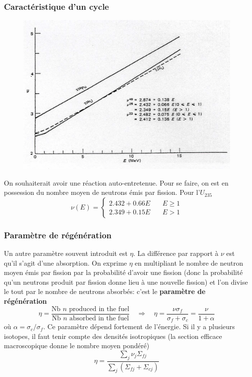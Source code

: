 \subsubsection{Caractéristique d'un cycle}
	\begin{figure}
	\vspace{-5mm}
	\includegraphics[scale=0.10]{ch1/image6.png}
	\end{figure}
On souhaiterait avoir une réaction auto-entretenue. Pour se faire, on est en possession du nombre 
moyen de neutrons émis par fission. Pour l'$U_{235}$
\begin{equation}
\nu(E) = \left\{\begin{array}{ll}
2.432 +0.66E&\quad E\geq 1\\
2.349+0.15E&\quad E>1
\end{array}\right.
\end{equation}

\subsubsection{Paramètre de régénération}
Un autre paramètre souvent introduit est $\eta$. La différence par rapport à $\nu$ est qu'il 
s'agit d'une absorption. On exprime $\eta$ en multipliant le nombre de neutron moyen émis par
fission par la probabilité d'avoir une fission (donc la probabilité qu'un neutrons produit par 
fission donne lieu à une nouvelle fission) et l'on divise le tout par le nombre de neutrons
absorbés: c'est le \textbf{paramètre de régénération}
\begin{equation}
\eta = \dfrac{\text{Nb $n$ produced in the fuel}}{\text{Nb $n$ absorbed in the fuel}}\quad\Rightarrow
\quad \eta = \dfrac{\nu\sigma_f}{\sigma_f+\sigma_c}=\dfrac{\nu}{1+\alpha}
\end{equation}
où $\alpha = \sigma_c/\sigma_f$. Ce paramètre dépend fortement de l'énergie. Si il y a plusieurs 
isotopes, il faut tenir compte des densités isotropiques (la section efficace macroscopique donne
le nombre moyen pondéré)
\begin{equation}
\eta = \dfrac{\sum_j\nu_j\Sigma_{fj}}{\sum_j \left(\Sigma_{fj}+\Sigma_{cj}\right)}
\end{equation}


